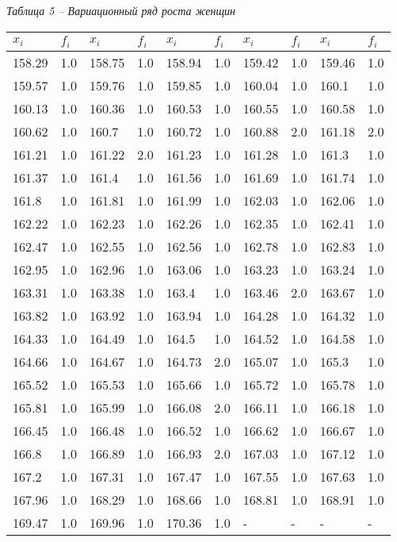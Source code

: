 \pagebreak

\noindent\textit{Таблица 5 -- Вариационный ряд роста женщин}
\begin{longtable}{|p{1.3cm}|p{1.3cm}|p{1.3cm}|p{1.3cm}|p{1.3cm}|p{1.3cm}|p{1.3cm}|p{1.3cm}|p{1.3cm}|p{1.3cm}|}
    \hline
    $x_i$  & $f_i$ & $x_i$  & $f_i$ & $x_i$  & $f_i$ & $x_i$  & $f_i$ & $x_i$  & $f_i$ \\\hline
    158.29 & 1.0   & 158.75 & 1.0   & 158.94 & 1.0   & 159.42 & 1.0   & 159.46 & 1.0   \\\hline
    159.57 & 1.0   & 159.76 & 1.0   & 159.85 & 1.0   & 160.04 & 1.0   & 160.1  & 1.0   \\\hline
    160.13 & 1.0   & 160.36 & 1.0   & 160.53 & 1.0   & 160.55 & 1.0   & 160.58 & 1.0   \\\hline
    160.62 & 1.0   & 160.7  & 1.0   & 160.72 & 1.0   & 160.88 & 2.0   & 161.18 & 2.0   \\\hline
    161.21 & 1.0   & 161.22 & 2.0   & 161.23 & 1.0   & 161.28 & 1.0   & 161.3  & 1.0   \\\hline
    161.37 & 1.0   & 161.4  & 1.0   & 161.56 & 1.0   & 161.69 & 1.0   & 161.74 & 1.0   \\\hline
    161.8  & 1.0   & 161.81 & 1.0   & 161.99 & 1.0   & 162.03 & 1.0   & 162.06 & 1.0   \\\hline
    162.22 & 1.0   & 162.23 & 1.0   & 162.26 & 1.0   & 162.35 & 1.0   & 162.41 & 1.0   \\\hline
    162.47 & 1.0   & 162.55 & 1.0   & 162.56 & 1.0   & 162.78 & 1.0   & 162.83 & 1.0   \\\hline
    162.95 & 1.0   & 162.96 & 1.0   & 163.06 & 1.0   & 163.23 & 1.0   & 163.24 & 1.0   \\\hline
    163.31 & 1.0   & 163.38 & 1.0   & 163.4  & 1.0   & 163.46 & 2.0   & 163.67 & 1.0   \\\hline
    163.82 & 1.0   & 163.92 & 1.0   & 163.94 & 1.0   & 164.28 & 1.0   & 164.32 & 1.0   \\\hline
    164.33 & 1.0   & 164.49 & 1.0   & 164.5  & 1.0   & 164.52 & 1.0   & 164.58 & 1.0   \\\hline
    164.66 & 1.0   & 164.67 & 1.0   & 164.73 & 2.0   & 165.07 & 1.0   & 165.3  & 1.0   \\\hline
    165.52 & 1.0   & 165.53 & 1.0   & 165.66 & 1.0   & 165.72 & 1.0   & 165.78 & 1.0   \\\hline
    165.81 & 1.0   & 165.99 & 1.0   & 166.08 & 2.0   & 166.11 & 1.0   & 166.18 & 1.0   \\\hline
    166.45 & 1.0   & 166.48 & 1.0   & 166.52 & 1.0   & 166.62 & 1.0   & 166.67 & 1.0   \\\hline
    166.8  & 1.0   & 166.89 & 1.0   & 166.93 & 2.0   & 167.03 & 1.0   & 167.12 & 1.0   \\\hline
    167.2  & 1.0   & 167.31 & 1.0   & 167.47 & 1.0   & 167.55 & 1.0   & 167.63 & 1.0   \\\hline
    167.96 & 1.0   & 168.29 & 1.0   & 168.66 & 1.0   & 168.81 & 1.0   & 168.91 & 1.0   \\\hline
    169.47 & 1.0   & 169.96 & 1.0   & 170.36 & 1.0   & -      & -     & -      & -     \\\hline
\end{longtable}


